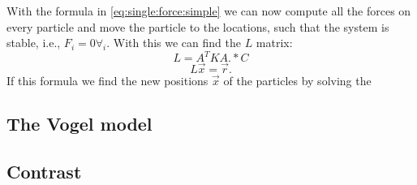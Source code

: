 
With the formula in \eqref{eq:single:force:simple} we can now compute all the forces on every particle and move the particle to the locations, such that the system is stable, i.e., $F_i = 0 \forall_i$. With this we can find the $L$ matrix:
%
\begin{equation}\label{eq:method:stabilizationEquationLHS}
	L = A^T K A .* C
\end{equation}
%
\begin{equation}\label{eq:method:stabilizationEquation}
	L\vec{x} = \vec{r}.
\end{equation}
%
If this formula we find the new positions $\vec{x}$ of the particles by solving the 


\subsection{The Vogel model}\label{ss:method:vogel}


\subsection{Contrast}\label{ss:method:contrast}




